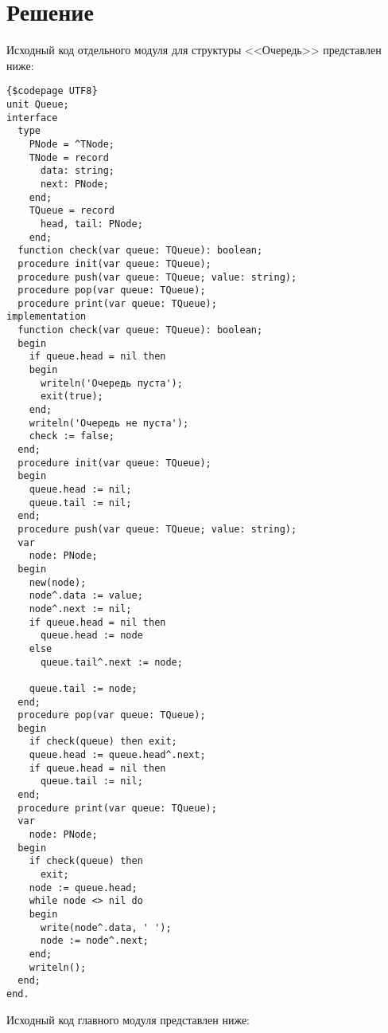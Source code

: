 \documentclass[a4paper,14pt]{extarticle}
\begin{document}
  \pagebreak
  \section*{Решение}

  Исходный код отдельного модуля для структуры <<Очередь>> представлен ниже:

  \noindent
  \begin{Verbatim}[tabsize=4,fontsize=\small]
{$codepage UTF8}
unit Queue;
interface
  type
    PNode = ^TNode;
    TNode = record
      data: string;
      next: PNode;
    end;
    TQueue = record
      head, tail: PNode;
    end;
  function check(var queue: TQueue): boolean;
  procedure init(var queue: TQueue);
  procedure push(var queue: TQueue; value: string);
  procedure pop(var queue: TQueue);
  procedure print(var queue: TQueue);
implementation
  function check(var queue: TQueue): boolean;
  begin
    if queue.head = nil then
    begin
      writeln('Очередь пуста');
      exit(true);
    end;
    writeln('Очередь не пуста');
    check := false;
  end;
  procedure init(var queue: TQueue);
  begin
    queue.head := nil;
    queue.tail := nil;
  end;
  procedure push(var queue: TQueue; value: string);
  var
    node: PNode;
  begin
    new(node);
    node^.data := value;
    node^.next := nil;
    if queue.head = nil then
      queue.head := node
    else
      queue.tail^.next := node;

    queue.tail := node;
  end;
  procedure pop(var queue: TQueue);
  begin
    if check(queue) then exit;
    queue.head := queue.head^.next;
    if queue.head = nil then
      queue.tail := nil;
  end;
  procedure print(var queue: TQueue);
  var
    node: PNode;
  begin
    if check(queue) then
      exit;
    node := queue.head;
    while node <> nil do
    begin
      write(node^.data, ' ');
      node := node^.next;
    end;
    writeln();
  end;
end.
  \end{Verbatim}

  Исходный код главного модуля представлен ниже:
\end{document}
